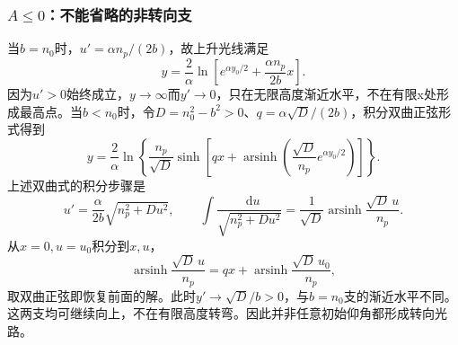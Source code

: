 \documentclass[UTF8,fontset=fandol,a4paper,11pt]{ctexart}
\newcommand{\dd}{\mathop{}\!\mathrm{d}}
\begin{document}
\subsubsection*{$A\le0$：不能省略的非转向支}
当$b=n_0$时，$u'=\alpha n_p/(2b)$，故上升光线满足
\[
\boxed{y=\frac2\alpha\ln\left[
e^{\alpha y_0/2}+\frac{\alpha n_p}{2b}x\right]}.
\]
因为$u'>0$始终成立，$y\to\infty$而$y'\to0$，只在无限高度渐近水平，不在有限x处形成最高点。当$b<n_0$时，令$D=n_0^2-b^2>0$、$q=\alpha\sqrt D/(2b)$，积分双曲正弦形式得到
\[
\boxed{y=\frac2\alpha\ln\left\{
\frac{n_p}{\sqrt D}\sinh\left[
qx+\operatorname{arsinh}
\left(\frac{\sqrt D}{n_p}e^{\alpha y_0/2}\right)
\right]\right\}}.
\]
上述双曲式的积分步骤是
\[
u'=\frac{\alpha}{2b}\sqrt{n_p^2+Du^2},\qquad
\int\frac{\dd u}{\sqrt{n_p^2+Du^2}}
=\frac1{\sqrt D}\operatorname{arsinh}\frac{\sqrt D\,u}{n_p}.
\]
从$x=0,u=u_0$积分到$x,u$，
\[
\operatorname{arsinh}\frac{\sqrt D\,u}{n_p}
=qx+\operatorname{arsinh}\frac{\sqrt D\,u_0}{n_p},
\]
取双曲正弦即恢复前面的解。此时$y'\to\sqrt D/b>0$，与$b=n_0$支的渐近水平不同。这两支均可继续向上，不在有限高度转弯。因此并非任意初始仰角都形成转向光路。
\end{document}
